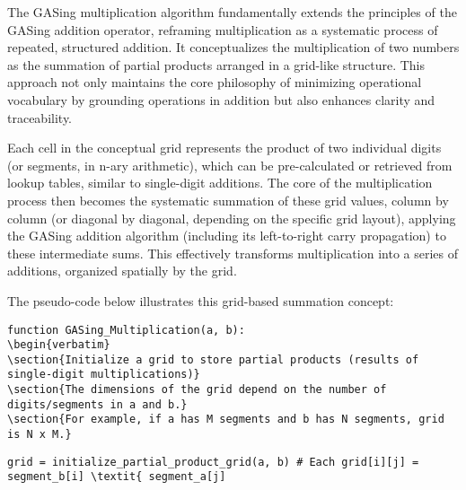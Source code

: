 The GASing multiplication algorithm fundamentally extends the principles of the GASing addition operator, reframing multiplication as a systematic process of repeated, structured addition. It conceptualizes the multiplication of two numbers as the summation of partial products arranged in a grid-like structure. This approach not only maintains the core philosophy of minimizing operational vocabulary by grounding operations in addition but also enhances clarity and traceability.

Each cell in the conceptual grid represents the product of two individual digits (or segments, in n-ary arithmetic), which can be pre-calculated or retrieved from lookup tables, similar to single-digit additions. The core of the multiplication process then becomes the systematic summation of these grid values, column by column (or diagonal by diagonal, depending on the specific grid layout), applying the GASing addition algorithm (including its left-to-right carry propagation) to these intermediate sums. This effectively transforms multiplication into a series of additions, organized spatially by the grid.

The pseudo-code below illustrates this grid-based summation concept:



\begin{verbatim}
function GASing_Multiplication(a, b):
\begin{verbatim}
\section{Initialize a grid to store partial products (results of single-digit multiplications)}
\section{The dimensions of the grid depend on the number of digits/segments in a and b.}
\section{For example, if a has M segments and b has N segments, grid is N x M.}
\end{verbatim}
        
\begin{verbatim}
grid = initialize_partial_product_grid(a, b) # Each grid[i][j] = segment_b[i] \textit{ segment_a[j]
\end{verbatim}
        
